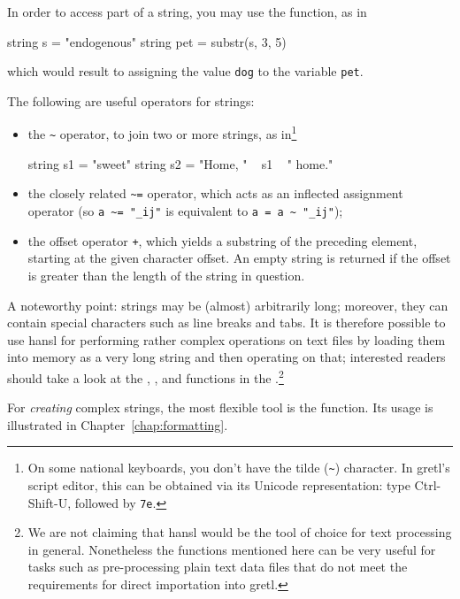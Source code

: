 In order to access part of a string, you may use the 
function, as in
\begin{code}
  string s = "endogenous"
  string pet = substr(s, 3, 5)
\end{code}
which would result to assigning the value \texttt{dog} to the variable
\texttt{pet}.

The following are useful operators for strings:
\begin{itemize}
\item the \verb|~| operator, to join two or more strings, as
  in\footnote{On some national keyboards, you don't have the tilde
    (\texttt{\~}) character. In gretl's script editor, this can be
    obtained via its Unicode representation: type Ctrl-Shift-U,
    followed by \texttt{7e}.}
  \begin{code}
    string s1 = "sweet"
    string s2 = "Home, " ~ s1 ~ " home."
  \end{code}
\item the closely related \verb|~=| operator, which acts as an
  inflected assignment operator (so \verb|a ~= "_ij"| is equivalent to
  \verb|a = a ~ "_ij"|);
\item the offset operator \texttt{+}, which yields a substring of the
  preceding element, starting at the given character offset.  An empty
  string is returned if the offset is greater than the length of the
  string in question.
\end{itemize}

A noteworthy point: strings may be (almost) arbitrarily long;
moreover, they can contain special characters such as line breaks and
tabs. It is therefore possible to use hansl for performing rather
complex operations on text files by loading them into memory as a very
long string and then operating on that; interested readers should take
a look at the , ,  and
 functions in the \GCR.\footnote{We are not claiming that
  hansl would be the tool of choice for text processing in
  general. Nonetheless the functions mentioned here can be very useful
  for tasks such as pre-processing plain text data files that do not
  meet the requirements for direct importation into gretl.}

For \emph{creating} complex strings, the most flexible tool is the
 function. Its usage is illustrated in
Chapter~\ref{chap:formatting}.


